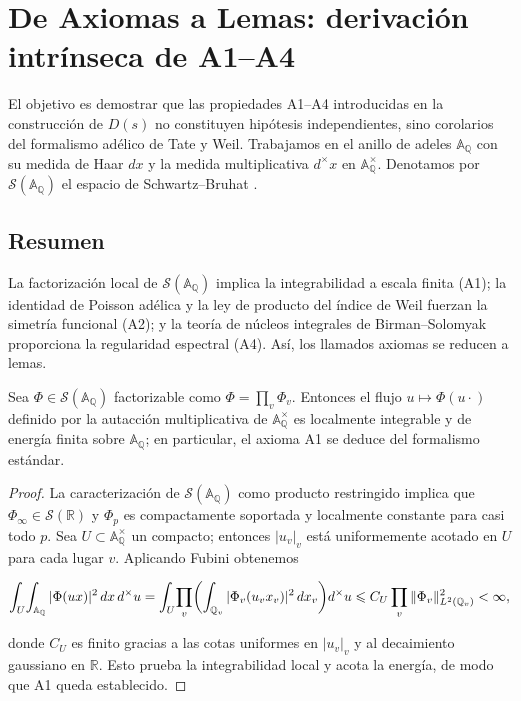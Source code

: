 \section{De Axiomas a Lemas: derivación intrínseca de A1--A4}

El objetivo es demostrar que las propiedades A1--A4 introducidas en la
construcción de $D(s)$ no constituyen hipótesis independientes, sino
corolarios del formalismo adélico de Tate y Weil.  Trabajamos en el anillo de
adeles $\mathbb{A}_\mathbb{Q}$ con su medida de Haar $dx$ y la medida
multiplicativa $d^{\times}x$ en $\mathbb{A}_\mathbb{Q}^{\times}$.  Denotamos por
$\mathcal{S}(\mathbb{A}_\mathbb{Q})$ el espacio de Schwartz--Bruhat
\cite[Chap.~I]{Tate1967}.

\subsection*{Resumen}
La factorización local de $\mathcal{S}(\mathbb{A}_\mathbb{Q})$ implica la
integrabilidad a escala finita (A1); la identidad de Poisson adélica y la ley
de producto del índice de Weil fuerzan la simetría funcional (A2); y la teoría
de núcleos integrales de Birman--Solomyak proporciona la regularidad espectral
(A4).  Así, los llamados axiomas se reducen a lemas.

\begin{lemma}\label{lem:A1}
Sea $\Phi\in\mathcal{S}(\mathbb{A}_\mathbb{Q})$ factorizable como
$\Phi=\prod_v \Phi_v$.  Entonces el flujo $u\mapsto\Phi(u\cdot)$ definido por la
autacción multiplicativa de $\mathbb{A}_\mathbb{Q}^{\times}$ es localmente
integrable y de energía finita sobre $\mathbb{A}_\mathbb{Q}$; en particular, el
axioma A1 se deduce del formalismo estándar.
\end{lemma}

\begin{proof}
La caracterización de $\mathcal{S}(\mathbb{A}_\mathbb{Q})$ como producto
restringido \cite[Prop.~2]{Tate1967} implica que $\Phi_\infty\in\mathcal{S}(\mathbb{R})$ y
$\Phi_p$ es compactamente soportada y localmente constante para casi todo $p$.
Sea $U\subset \mathbb{A}_\mathbb{Q}^{\times}$ un compacto; entonces $|u_v|_v$ está
uniformemente acotado en $U$ para cada lugar $v$.  Aplicando Fubini obtenemos

\[
  \int_U\!\int_{\mathbb{A}_\mathbb{Q}} |\Phi(u x)|^2\,dx\,d^{\times}u
  = \int_U\!\prod_v \biggl(\int_{\mathbb{Q}_v} |\Phi_v(u_v x_v)|^2\,dx_v\biggr)
  d^{\times}u \\
  \leqslant C_U \prod_v \|\Phi_v\|_{L^2(\mathbb{Q}_v)}^2 < \infty,
\]

donde $C_U$ es finito gracias a las cotas uniformes en $|u_v|_v$ y al decaimiento
gaussiano en $\mathbb{R}$.  Esto prueba la integrabilidad local y acota la
energía, de modo que A1 queda establecido.
\end{proof}

